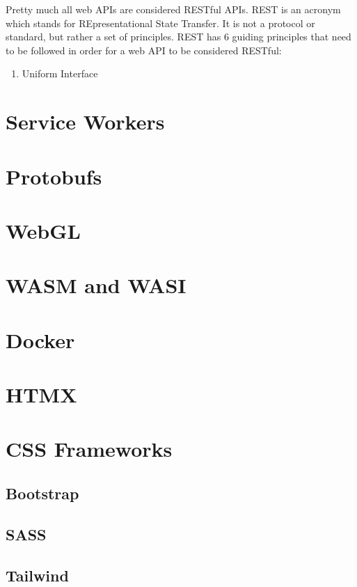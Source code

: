 \documentclass{article}
\begin{document}
Pretty much all web APIs are considered RESTful APIs. REST is an acronym which stands for REpresentational
State Transfer. It is not a protocol or standard, but rather a set of principles. REST has 6 guiding principles
that need to be followed in order for a web API to be considered RESTful:

\begin{enumerate}

\item Uniform Interface

\end{enumerate}

\section{Service Workers}

\section{Protobufs}

\section{WebGL}

\section{WASM and WASI}

\section{Docker}

\section{HTMX}

\section{CSS Frameworks}

\subsection{Bootstrap}

\subsection{SASS}

\subsection{Tailwind}
\end{document}
